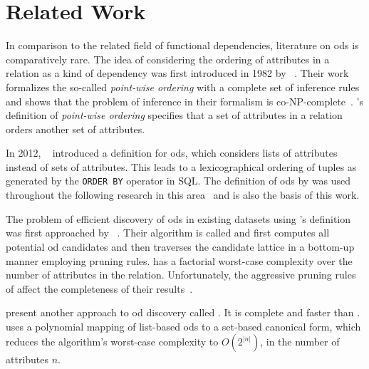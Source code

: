 
\section{Related Work}\label{sec:related_work}
In comparison to the related field of functional dependencies, literature on \glspl{od} is comparatively rare.
The idea of considering the ordering of attributes in a relation as a kind of dependency was first introduced in 1982 by \citeauthor{ginsburg}~\cite{ginsburg}.
Their work formalizes the so-called \textit{point-wise ordering} with a complete set of inference rules and shows that the problem of inference in their formalism is co-NP-complete~\cite{ginsburg}.
\citeauthor{ginsburg}'s definition of \textit{point-wise ordering} specifies that a set of attributes in a relation orders another set of attributes.

In 2012, \citeauthor{szlichta:fundamentals}~\cite{szlichta:fundamentals} introduced a definition for \glspl{od}, which considers lists of attributes instead of sets of attributes.
This leads to a lexicographical ordering of tuples as generated by the \texttt{ORDER BY} operator in SQL.
The definition of \glspl{od} by \citeauthor{szlichta:fundamentals} was used throughout the following research in this area~\cite{consonni, langer, szlichta:discovery} and is also the basis of this work.

The problem of efficient discovery of \glspl{od} in existing datasets using \citeauthor{szlichta:fundamentals}'s definition was first approached by \citeauthor{langer}~\cite{langer}.
Their algorithm is called \order{} and first computes all potential \gls{od} candidates and then traverses the candidate lattice in a bottom-up manner employing pruning rules.
\order{} has a factorial worst-case complexity over the number of attributes in the relation.
Unfortunately, the aggressive pruning rules of \order{} affect the completeness of their results~\cite{szlichta:discovery}.

\citeauthor{szlichta:discovery} present another approach to \gls{od} discovery called \fastod{}.
It is complete and faster than \order{}.
\fastod{} uses a polynomial mapping of list-based \glspl{od} to a set-based canonical form, which reduces the algorithm's worst-case complexity to $O(2^{\left|n\right|})$, in the number of attributes $n$.

